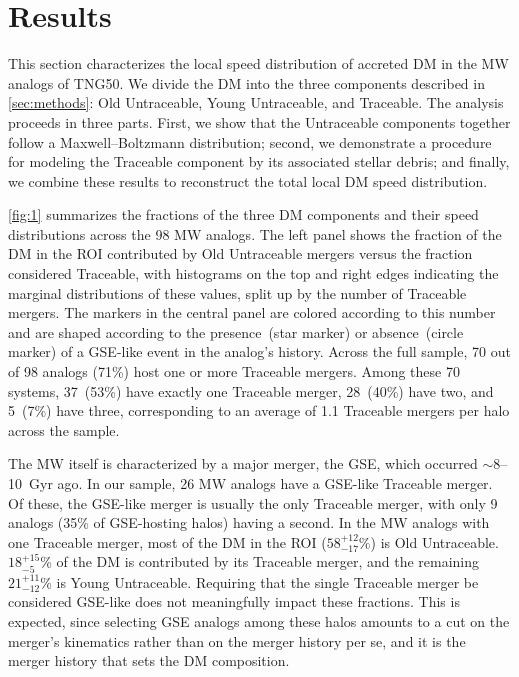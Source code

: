 \documentclass[twocolumn,tighten,twocolappendix]{aastex701}
\newcommand{\osim}{\mathord{\sim}}
\begin{document}
\section{Results} \label{sec:results}

This section characterizes the local speed distribution of accreted DM in the MW analogs of TNG50. We divide the DM into the three components described in \autoref{sec:methods}: Old Untraceable, Young Untraceable, and Traceable. The analysis proceeds in three parts. First, we show that the Untraceable components together follow a Maxwell--Boltzmann distribution; second, we demonstrate a procedure for modeling the Traceable component by its associated stellar debris; and finally, we combine these results to reconstruct the total local DM speed distribution. 

\autoref{fig:1} summarizes the fractions of the three DM components and their speed distributions across the 98 MW analogs. The left panel shows the fraction of the DM in the ROI contributed by Old Untraceable mergers versus the fraction considered Traceable, with histograms on the top and right edges indicating the marginal distributions of these values, split up by the number of Traceable mergers. The markers in the central panel are colored according to this number and are shaped according to the presence~(star marker) or absence~(circle marker) of a GSE-like event in the analog's history. Across the full sample, 70 out of 98 analogs (71\%) host one or more Traceable mergers. Among these 70 systems, 37~(53\%) have exactly one Traceable merger, 28~(40\%) have two, and 5~(7\%) have three, corresponding to an average of 1.1 Traceable mergers per halo across the sample.

The MW itself is characterized by a major merger, the GSE, which occurred $\osim 8$--10~Gyr ago. In our sample, 26 MW analogs have a GSE-like Traceable merger. Of these, the GSE-like merger is usually the only Traceable merger, with only 9 analogs (35\% of GSE-hosting halos) having a second. In the MW analogs with one Traceable merger, most of the DM in the ROI ($58^{+12}_{-17}\%$) is Old Untraceable. $18^{+15}_{-5}$\% of the DM is contributed by its Traceable merger, and the remaining $21^{+11}_{-12}\%$ is Young Untraceable. Requiring that the single Traceable merger be considered GSE-like does not meaningfully impact these fractions. This is expected, since selecting GSE analogs among these halos amounts to a cut on the merger's kinematics rather than on the merger history per se, and it is the merger history that sets the DM composition.
\end{document}
